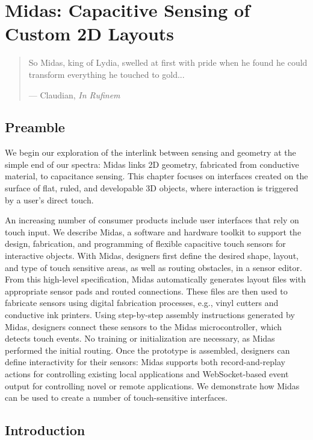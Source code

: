 \chapter{Midas: Capacitive Sensing of Custom 2D Layouts}

\begin{quote}
So Midas, king of Lydia, swelled at first with pride when he found he could transform everything he touched to gold...

--- Claudian, \emph{In Rufinem}
\end{quote}

\section{Preamble}

We begin our exploration of the interlink between sensing and geometry at the simple end of our spectra: Midas links 2D geometry, fabricated from conductive material, to capacitance sensing. This chapter focuses on interfaces created on the surface of flat, ruled, and developable 3D objects, where interaction is triggered by a user's direct touch.

An increasing number of consumer products include user interfaces that rely on touch input. We describe Midas, a software and hardware toolkit to support the design, fabrication, and programming of flexible capacitive touch sensors for interactive objects. With Midas, designers first define the desired shape, layout, and type of touch sensitive areas, as well as routing obstacles, in a sensor editor. From this high-level specification, Midas automatically generates layout files with appropriate sensor pads and routed connections. These files are then used to fabricate sensors using digital fabrication processes, e.g., vinyl cutters and conductive ink printers. Using step-by-step assembly instructions generated by Midas, designers connect these sensors to the Midas microcontroller, which detects touch events. No training or initialization are necessary, as Midas performed the initial routing. Once the prototype is assembled, designers can define interactivity for their sensors: Midas supports both record-and-replay actions for controlling existing local applications and WebSocket-based event output for controlling novel or remote applications.  We demonstrate how Midas can be used to create a number of touch-sensitive interfaces.

\section{Introduction}

